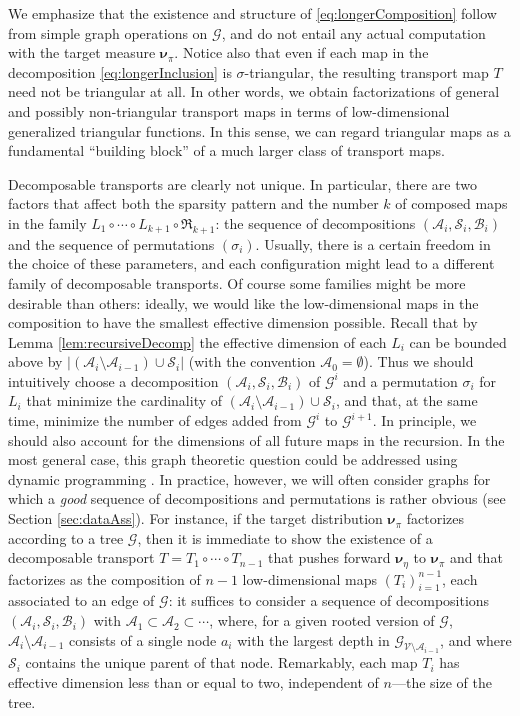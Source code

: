\documentclass[twoside,11pt]{article}
\newcommand{\genm}{\boldsymbol{\nu} }   %
\newcommand{\Bc}{\mathcal{B}}
\newcommand{\Vc}{\mathcal{V}}
\newcommand{\Ac}{\mathcal{A}}
\newcommand{\Sc}{\mathcal{S}}
\newcommand{\Gcb}{\boldsymbol{\mathcal{G}}}
\newcommand{\lmap}{L} %
\newcommand{\Aset}{ \Ac }
\newcommand{\Bset}{ \Bc }
\newcommand{\Sset}{ \Sc }
\begin{document}
We emphasize that the existence and structure
of \eqref{eq:longerComposition} follow from simple 
graph operations on $\Gcb$, and do not entail any actual
computation with the target measure $\genm_\pi$.
%
%
Notice also that even if each map in the decomposition \eqref{eq:longerInclusion}
is $\sigma$-triangular, the resulting transport map $T$ need not be
triangular at all.  In other words, we  obtain 
factorizations of general and possibly non-triangular
transport maps in terms of low-dimensional generalized triangular functions.
In this sense, we can regard triangular maps as a fundamental 
``building block'' of a much larger class of transport maps.


Decomposable transports are clearly not unique. 
In particular, there are two factors that affect both the sparsity pattern and the
number $k$ of composed maps
in the family $\lmap_1 \circ \cdots \circ \lmap_{k+1} \circ \mathfrak{R}_{k+1}$:
the sequence of decompositions $(\Aset_i,\Sset_i,\Bset_i)$ and the sequence
of permutations $(\sigma_i)$. 
Usually, there is a certain freedom in the choice of these
parameters, and each configuration might lead to a different family
of decomposable transports.
Of course some families might be more desirable than others:
ideally, we would like the low-dimensional maps in the
composition to have the smallest effective dimension possible.
Recall that by Lemma \ref{lem:recursiveDecomp}
the effective dimension of each $\lmap_i$ can be bounded
above by $|(\Aset_{i} \setminus \Aset_{i-1}) \cup \Sset_{i}|$ 
(with the convention $\Aset_{0} = \emptyset$).
Thus we should intuitively choose a decomposition
$(\Aset_i,\Sset_i,\Bset_i)$ of $\Gcb^i$ and a permutation $\sigma_i$ for $\lmap_i$ 
that
minimize the cardinality of $(\Aset_{i} \setminus \Aset_{i-1}) \cup \Sset_{i}$, and that,
at the same time, minimize the number of edges added from $\Gcb^i$
to $\Gcb^{i+1}$.
In principle, we
should also account for the dimensions of all future maps in the
recursion. In the most general case, this graph theoretic
question could be addressed using dynamic programming
\citep{bertsekas1995dynamic}.  In practice, however, we will often
consider graphs for which a {\it good} sequence of decompositions and
permutations is
rather obvious (see Section \ref{sec:dataAss}). 
For instance, if the target distribution $\genm_\pi$ %
factorizes according to 
a tree $\Gcb$, then it is immediate to 
show the existence of a decomposable transport $T=T_1 \circ \cdots \circ T_{n-1}$ 
that pushes forward $\genm_\eta$ to $\genm_\pi$ and that factorizes
as the composition of $n-1$ low-dimensional maps
$(T_i)_{i=1}^{n-1}$, each associated to an edge of $\Gcb$:
it suffices to consider a sequence of decompositions $(\Aset_i,\Sset_i,\Bset_i)$
with $\Aset_1 \subset \Aset_2 \subset \cdots$, where,
for a
given rooted version of $\Gcb$,
$\Aset_{i}\setminus \Aset_{i-1}$ consists of a single node $a_{i}$ with
the largest depth in $\Gcb_{\Vc \setminus \Aset_{i-1}}$, and where $\Sset_{i}$
contains the unique parent of that node.
%
%
%
%
%
%
Remarkably, each map $T_i$ has effective dimension less than or equal
to two, independent of $n$---the size
of the tree.
\end{document}
